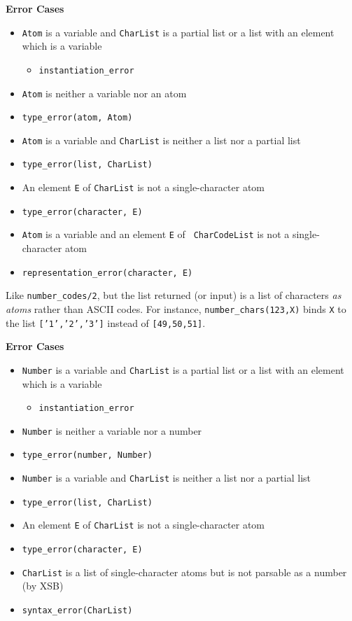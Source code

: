 \begin{description}
{\bf Error Cases}
\begin{itemize}
\item {\tt Atom} is a variable and {\tt CharList} is a partial
  list or a list with an element which is a variable
\begin{itemize}
\item {\tt instantiation\_error}
\end{itemize}
\item {\tt Atom} is neither a variable nor an atom 
\bi
\item {\tt type\_error(atom, Atom)}
\ei
\item {\tt Atom} is a variable and {\tt CharList} is neither a
  list nor a partial list 
\bi
\item {\tt type\_error(list, CharList)}
\ei
\item An element {\tt E} of {\tt CharList} is not a single-character
atom
\bi
\item {\tt type\_error(character, E)}
\ei
\item {\tt Atom} is a variable and an element {\tt E} of {\tt
  CharCodeList} is not a single-character atom
\bi
\item {\tt representation\_error(character, E)}
\ei
\end{itemize}

%
    Like \verb|number_codes/2|, but the list returned (or input) is a list of
    characters \emph{as atoms} rather than ASCII codes. For instance, 
    \verb|number_chars(123,X)| binds {\tt X} to the list {\tt ['1','2','3']}
    instead of {\tt [49,50,51]}.

{\bf Error Cases}
\begin{itemize}
\item {\tt Number} is a variable and {\tt CharList} is a partial
  list or a list with an element which is a variable
\begin{itemize}
\item {\tt instantiation\_error}
\end{itemize}
\item {\tt Number} is neither a variable nor a number
\bi
\item {\tt type\_error(number, Number)}
\ei
\item {\tt Number} is a variable and {\tt CharList} is neither a
  list nor a partial list 
\bi
\item {\tt type\_error(list, CharList)}
\ei
\item An element {\tt E} of {\tt CharList} is not a single-character
atom
\bi
\item {\tt type\_error(character, E)}
\ei
\item {\tt CharList} is a list of single-character atoms but is not
  parsable as a number (by XSB)
\bi
\item {\tt syntax\_error(CharList)}
\ei
\end{itemize}


\end{description}
